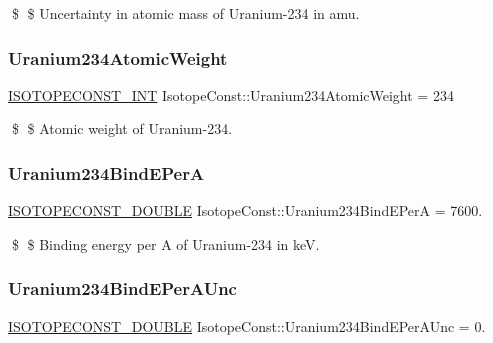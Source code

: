 \$ \$ Uncertainty in atomic mass of Uranium-\/234 in amu. \mbox{\label{group___isotope_const-_uranium-_u234_ga6e2110346dd9b0773ad788f5bb6b56c0}} 
\subsubsection{\texorpdfstring{Uranium234\+Atomic\+Weight}{Uranium234AtomicWeight}}
{\footnotesize\ttfamily \mbox{\hyperlink{group___isotope_const-_macros_ga5f18360b3e99483a35c32d789e62621c}{I\+S\+O\+T\+O\+P\+E\+C\+O\+N\+S\+T\+\_\+\+I\+NT}} Isotope\+Const\+::\+Uranium234\+Atomic\+Weight = 234}

\$ \$ Atomic weight of Uranium-\/234. \mbox{\label{group___isotope_const-_uranium-_u234_ga26cfee388e4ee2aff4f634d93cd0fa61}} 
\subsubsection{\texorpdfstring{Uranium234\+Bind\+E\+PerA}{Uranium234BindEPerA}}
{\footnotesize\ttfamily \mbox{\hyperlink{group___isotope_const-_macros_ga8f45a7272ce02c0b4c65c44636ed719a}{I\+S\+O\+T\+O\+P\+E\+C\+O\+N\+S\+T\+\_\+\+D\+O\+U\+B\+LE}} Isotope\+Const\+::\+Uranium234\+Bind\+E\+PerA = 7600.}

\$ \$ Binding energy per A of Uranium-\/234 in keV. \mbox{\label{group___isotope_const-_uranium-_u234_ga97ca22135580a34a6e01a6dad0e0bb69}} 
\subsubsection{\texorpdfstring{Uranium234\+Bind\+E\+Per\+A\+Unc}{Uranium234BindEPerAUnc}}
{\footnotesize\ttfamily \mbox{\hyperlink{group___isotope_const-_macros_ga8f45a7272ce02c0b4c65c44636ed719a}{I\+S\+O\+T\+O\+P\+E\+C\+O\+N\+S\+T\+\_\+\+D\+O\+U\+B\+LE}} Isotope\+Const\+::\+Uranium234\+Bind\+E\+Per\+A\+Unc = 0.}


